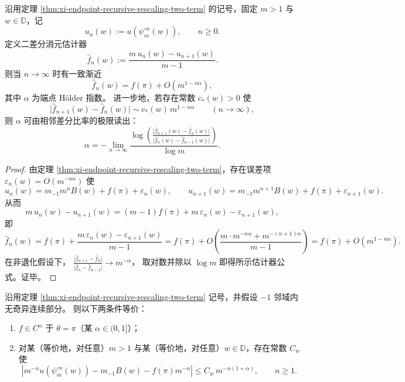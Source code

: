 \begin{corollary}\label{cor:xi-endpoint-second-difference-elimination-holder-estimator}
沿用定理 \ref{thm:xi-endpoint-recursive-rescaling-two-term} 的记号，固定 \(m>1\) 与 \(w\in\mathbb{D}\)，记
\[
u_n(w):=u\!\left(\psi_m^{\circ n}(w)\right),\qquad n\ge 0.
\]
定义二差分消元估计器
\[
\widehat f_n(w):=\frac{m\,u_n(w)-u_{n+1}(w)}{m-1}.
\]
则当 \(n\to\infty\) 时有一致渐近
\[
\widehat f_n(w)=f(\pi)+O\!\left(m^{1-n\alpha}\right),
\]
其中 \(\alpha\) 为端点 Hölder 指数。
进一步地，若存在常数 \(c_\ast(w)>0\) 使
\[
\bigl|\widehat f_{n+1}(w)-\widehat f_n(w)\bigr|\sim c_\ast(w)\,m^{1-n\alpha}\qquad(n\to\infty),
\]
则 \(\alpha\) 可由相邻差分比率的极限读出：
\[
\alpha
=
-\lim_{n\to\infty}\frac{\log\!\left(\frac{\bigl|\widehat f_{n+1}(w)-\widehat f_n(w)\bigr|}{\bigl|\widehat f_{n}(w)-\widehat f_{n-1}(w)\bigr|}\right)}{\log m}.
\]
\end{corollary}

\begin{proof}
由定理 \ref{thm:xi-endpoint-recursive-rescaling-two-term}，存在误差项 \(\varepsilon_n(w)=O(m^{-n\alpha})\) 使
\[
u_n(w)=m_{-1}m^nB(w)+f(\pi)+\varepsilon_n(w),
\qquad
u_{n+1}(w)=m_{-1}m^{n+1}B(w)+f(\pi)+\varepsilon_{n+1}(w).
\]
从而
\[
m\,u_n(w)-u_{n+1}(w)=(m-1)f(\pi)+m\,\varepsilon_n(w)-\varepsilon_{n+1}(w),
\]
即
\[
\widehat f_n(w)=f(\pi)+\frac{m\,\varepsilon_n(w)-\varepsilon_{n+1}(w)}{m-1}
=f(\pi)+O\!\left(\frac{m\cdot m^{-n\alpha}+m^{-(n+1)\alpha}}{m-1}\right)
=f(\pi)+O\!\left(m^{1-n\alpha}\right).
\]
在非退化假设下，
\(
\frac{\bigl|\widehat f_{n+1}-\widehat f_n\bigr|}{\bigl|\widehat f_{n}-\widehat f_{n-1}\bigr|}\to m^{-\alpha}
\)，
取对数并除以 \(\log m\) 即得所示估计器公式。证毕。
\end{proof}

\begin{proposition}\label{prop:xi-endpoint-recursive-error-holder-equivalence}
沿用定理 \ref{thm:xi-endpoint-recursive-rescaling-two-term} 记号，并假设 \(-1\) 邻域内无奇异连续部分。
则以下两条件等价：
\begin{enumerate}
  \item \(f\in C^\alpha\) 于 \(\theta=\pi\)（某 \(\alpha\in(0,1]\)）；
  \item 对某（等价地，对任意）\(m>1\) 与某（等价地，对任意）\(w\in\mathbb D\)，存在常数 \(C_w\) 使
  \[
  \left|
  m^{-n}u\!\left(\psi_m^{\circ n}(w)\right)
  -m_{-1}B(w)-f(\pi)m^{-n}
  \right|
  \le C_w\,m^{-n(1+\alpha)},\qquad n\ge 1.
  \]
\end{enumerate}
\end{proposition}

